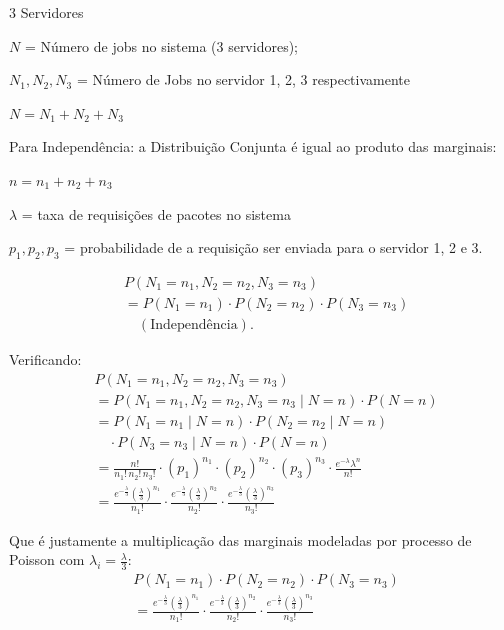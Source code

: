 \documentclass[conference]{IEEE_Conference_Template/IEEEtran}
\begin{document}
3 Servidores

$N$ = Número de jobs no sistema (3 servidores);

$N_1, N_2, N_3$ = Número de Jobs no servidor 1, 2, 3 respectivamente

$N = N_1 + N_2 + N_3$

Para Independência: a Distribuição Conjunta é igual ao produto das marginais:

$n = n_1 + n_2 + n_3$

$\lambda$ = taxa de requisições de pacotes no sistema

$p_1, p_2, p_3$ = probabilidade de a requisição ser enviada para o servidor 1, 2 e 3.

\begin{align}
&P(N_1 = n_1, N_2 = n_2, N_3 = n_3) \nonumber\\
&= P(N_1 = n_1) \cdot P(N_2 = n_2) \cdot P(N_3 = n_3) \nonumber\\
&\quad (\text{Independência}).
\end{align}

Verificando:
\begin{align}
&P(N_1 = n_1, N_2 = n_2, N_3 = n_3) \nonumber\\
&= P(N_1 = n_1, N_2 = n_2, N_3 = n_3 \mid N = n) \cdot P(N = n) \nonumber\\
&= P(N_1 = n_1 \mid N = n) \cdot P(N_2 = n_2 \mid N = n) \nonumber\\
&\quad \cdot P(N_3 = n_3 \mid N = n) \cdot P(N = n) \nonumber\\
&= \frac{n!}{n_1! \, n_2! \, n_3!} \cdot (p_1)^{n_1} \cdot (p_2)^{n_2} \cdot (p_3)^{n_3} \cdot \frac{e^{-\lambda} \lambda^n}{n!} \nonumber\\
&= \frac{e^{-\frac{\lambda}{3}} \left(\frac{\lambda}{3}\right)^{n_1}}{n_1!} \cdot \frac{e^{-\frac{\lambda}{3}} \left(\frac{\lambda}{3}\right)^{n_2}}{n_2!} \cdot \frac{e^{-\frac{\lambda}{3}} \left(\frac{\lambda}{3}\right)^{n_3}}{n_3!}
\end{align}

Que é justamente a multiplicação das marginais modeladas por processo de Poisson com $\lambda_i = \frac{\lambda}{3}$:
\begin{align}
&P(N_1 = n_1) \cdot P(N_2 = n_2) \cdot P(N_3 = n_3) \nonumber\\
&= \frac{e^{-\frac{\lambda}{3}} \left(\frac{\lambda}{3}\right)^{n_1}}{n_1!} \cdot \frac{e^{-\frac{\lambda}{3}} \left(\frac{\lambda}{3}\right)^{n_2}}{n_2!} \cdot \frac{e^{-\frac{\lambda}{3}} \left(\frac{\lambda}{3}\right)^{n_3}}{n_3!}
\end{align}
\end{document}
